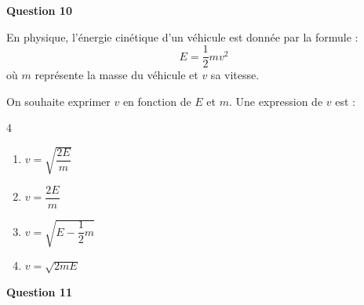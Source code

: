 \textbf{Question 10}
	
	En physique, l'énergie cinétique d'un véhicule est donnée par la formule :
	\[E=\dfrac{1}{2}m v^{2}\]
	où $m$ représente la masse du véhicule et $v$ sa vitesse.
	
	On souhaite exprimer $v$ en fonction de $E$ et $m$. Une expression de $v$ est :
	
\begin{multicols}{4}
\begin{enumerate}[label=\textbf{\alph* .}]
	\item $v=\sqrt{\dfrac{2E}{m}}$
	\item $v=\dfrac{2E}{m}$ 
	\item $v=\sqrt{E-\dfrac{1}{2}m}$ 
	\item $v=\sqrt{2mE}$ 
\end{enumerate}
\end{multicols}


		\textbf{Question 11}

